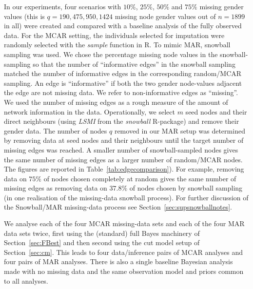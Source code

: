 \documentclass{article}
\begin{document}
In our experiments, four scenarios with $10\%$, $25\%$, $50\%$ and $75\%$ missing gender values (this is $q=190,475,950,1424$ missing node gender values out of $n=1899$ in all) were created and compared with a baseline analysis of the fully observed data. For the MCAR setting, the individuals selected for imputation were randomly selected with the \textit{sample} function in R. To mimic MAR, snowball sampling was used. We chose the percentage missing node values in the snowball-sampling so that the number of ``informative edges'' in the snowball sampling matched the number of informative edges in the corresponding random/MCAR sampling. An edge is ``informative'' if both the two gender node-values adjacent the edge are not missing data. We refer to non-informative edges as ``missing''.
We used the number of missing edges as a rough measure of the amount of network information in the data. Operationally, we select $m$ seed nodes and their direct neighbours (using \textit{LSMI} from the \textit{snowball} R-package) and remove their gender data. The number of nodes $q$ removed in our MAR setup was determined by removing data at seed nodes and their neighbours until the target number of missing edges was reached. A smaller number of snowball-sampled nodes gives the same number of missing edges as a larger number of random/MCAR nodes. The figures are reported in Table~\ref{tab:edgecomparison}). For example, removing data on $75\%$ of nodes chosen completely at random gives the same number of missing edges as removing data on $37.8\%$ of nodes chosen by snowball sampling (in one realisation of the missing-data snowball process). For further discussion of the Snowball/MAR missing-data process see Section~\ref{sec:supsnowballnotes}.

We analyse each of the four MCAR missing-data sets and each of the four MAR data sets twice,
first using the (standard) full Bayes machinery of 
Section~\ref{sec:FBest} and then second using the cut model setup of Section~\ref{sec:cm}.
This leads to four data/inference pairs of MCAR analyses and four pairs of MAR analyses. 
There is also a single baseline Bayesian 
analysis made with no missing data and the same observation model and priors common to all analyses. 
\end{document}
